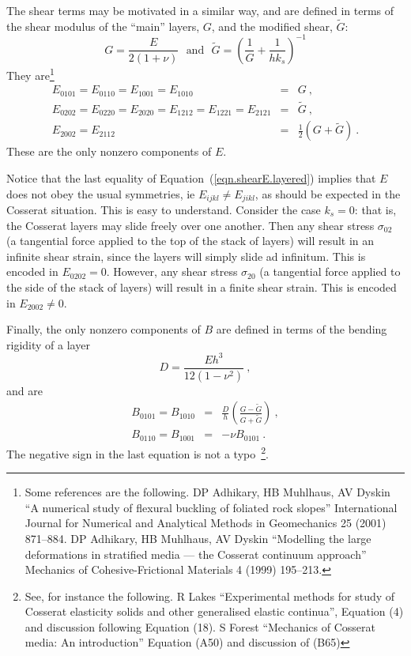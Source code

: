 \documentclass[]{scrreprt}
\begin{document}
The shear terms may be motivated in a similar way, and are defined in
terms of the shear modulus of the ``main'' layers, $G$, and the
modified shear, $\tilde{G}$:
\begin{equation}
G = \frac{E}{2(1+\nu)} \ \ \ \mbox{and}\ \ \ \tilde{G} = \left(
\frac{1}{G} + \frac{1}{hk_{s}} \right)^{-1}
\end{equation}
They
are\footnote{Some references are the following.  DP Adhikary, HB Muhlhaus, AV
  Dyskin ``A numerical study of flexural buckling of foliated rock
  slopes'' International Journal for Numerical and Analytical Methods
  in Geomechanics 25 (2001) 871--884.  DP Adhikary, HB Muhlhaus, AV
  Dyskin ``Modelling the large deformations in stratified media ---
  the Cosserat continuum approach'' Mechanics of Cohesive-Frictional
  Materials 4 (1999) 195--213.}
\begin{eqnarray}
E_{0101} = E_{0110} = E_{1001} = E_{1010} & = & G \ , \nonumber
\\ E_{0202} = E_{0220} = E_{2020} = E_{1212} = E_{1221} = E_{2121} & =
& \tilde{G} \ , \nonumber \\
E_{2002} = E_{2112} & = & \mbox{$\frac{1}{2}$}(G + \tilde{G})\ .
\label{eqn.shearE.layered}
\end{eqnarray}
These are the only nonzero components of $E$.

Notice that the last equality of Equation~(\ref{eqn.shearE.layered})
implies that $E$ does not obey the usual symmetries, ie $E_{ijkl}\neq
E_{jikl}$, as should be expected in the Cosserat situation.  This is
easy to understand.  Consider the case $k_{s}=0$: that is, the
Cosserat layers may slide freely over one another.  Then any shear
stress $\sigma_{02}$ (a tangential force applied to the top of the
stack of layers) will result in an infinite shear strain, since
the layers will simply slide ad infinitum.  This is encoded in
$E_{0202}=0$.  However, any shear stress $\sigma_{20}$ (a tangential
force applied to the side of the stack of layers) will result in a
finite shear strain.  This is encoded in $E_{2002}\neq 0$.

Finally, the only nonzero components of $B$ are defined in terms of
the bending rigidity of a layer
\begin{equation}
D = \frac{Eh^{3}}{12(1-\nu^{2})} \ ,
\end{equation}
and are
\begin{eqnarray}
B_{0101} = B_{1010} & = & \frac{D}{h} \left(\frac{G - \tilde{G}}{G +
  \tilde{G}}\right) \ , \nonumber \\
B_{0110} = B_{1001} & = & -\nu B_{0101} \ .
\end{eqnarray}
The negative sign in the last equation is not a typo~\footnote{See, for
  instance the following.  R Lakes ``Experimental methods for study of
  Cosserat elasticity solids and other generalised elastic continua'',
  Equation (4) and discussion following Equation (18).  S Forest
  ``Mechanics of Cosserat media: An introduction'' Equation (A50) and
  discussion of (B65)}.
\end{document}
